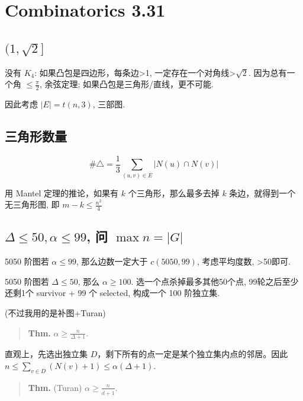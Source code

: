 \chapter{Combinatorics 3.31}
\label{ch:250331}

\section{$(1,\sqrt{2}]$}


没有 $K_4$: 如果凸包是四边形，每条边>1, 一定存在一个对角线>$\sqrt{2}$. 因为总有一个角 $\leq\frac{\pi}{2}$, 余弦定理; 如果凸包是三角形/直线，更不可能.

因此考虑 $|E|=t(n,3)$, 三部图.

\section{三角形数量}


\[
\#\bigtriangleup=\frac{1}{3}\sum_{(u,v)\in E}|N(u)\cap N(v)|
\]

用 Mantel 定理的推论，如果有 $k$ 个三角形，那么最多去掉 $k$ 条边，就得到一个无三角形图, 即 $m-k\leq\frac{n^2}{4}$

\section{$\Delta\leq50,\alpha\leq99$, 问 $\max n=|G|$}


5050 阶图若 $\alpha\leq 99$, 那么边数一定大于 $c(5050,99)$, 考虑平均度数, >50即可.

5050 阶图若 $\Delta\leq50$, 那么 $\alpha\geq 100$. 选一个点杀掉最多其他50个点, 99轮之后至少还剩1个 survivor + 99 个 selected, 构成一个 100 阶独立集.

(不过我用的是补图+Turan)

\begin{quotation}
\textbf{Thm.} $\alpha\geq\frac{n}{\Delta+1}$.
\end{quotation}

直观上，先选出独立集 $D$，剩下所有的点一定是某个独立集内点的邻居。因此 $n\leq\sum_{v\in D}(N(v)+1)\leq\alpha(\Delta+1)$.

\begin{quotation}
\textbf{Thm.} (Turan) $\alpha\geq\frac{n}{\overline{d}+1}$.
\end{quotation}

